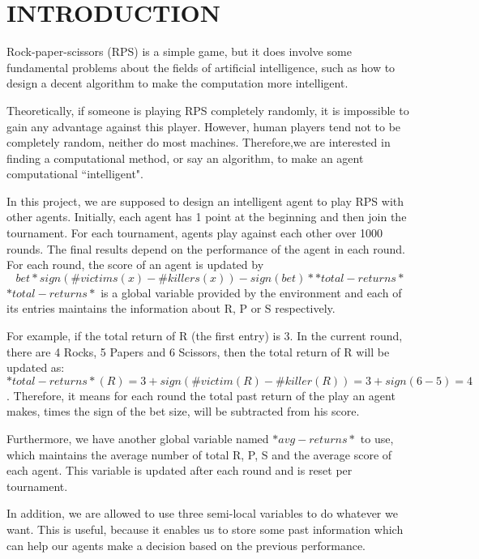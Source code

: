\documentclass[10pt]{article}
\begin{document}
\maketitle

\section{INTRODUCTION}
Rock-paper-scissors (RPS) is a simple game, but it does involve some fundamental problems about the fields of artificial intelligence, such as how to design a decent algorithm to make the computation more intelligent.

Theoretically, if someone is playing RPS completely randomly, it is impossible to gain any advantage against this player. However, human players tend not to be completely random, neither do most machines. Therefore,we are interested in finding a computational method, or say an algorithm, to make an agent computational ``intelligent".

In this project, we are supposed to design an intelligent agent to play RPS with other agents. Initially, each agent has 1 point at the beginning and then join the tournament. For each tournament, agents play against each other over 1000 rounds. The final results depend on the performance of the agent in each round. For each round, the score of an agent is updated by 
$$bet * sign(\#victims(x)-\#killers(x)) - sign(bet)* *total-returns*$$
$*total-returns*$ is a global variable provided by the environment and each of its entries maintains the information about R, P or S respectively. 

For example, if the total return of R (the first entry) is 3. In the current round, there are 4 Rocks, 5 Papers and 6 Scissors, then the total return of R will be updated as: $*total-returns*(R) = 3 + sign(\# victim(R) - \# killer(R)) = 3 + sign(6 - 5) = 4$. Therefore, it means for each round the total past return of the play an agent makes, times the sign of the bet size, will be subtracted from his score.

Furthermore, we have another global variable named $*avg-returns*$ to use, which maintains the average number of total R, P, S and the average score of each agent. This variable is updated after each round and is reset per tournament.

In addition, we are allowed to use three semi-local variables to do whatever we want. This is useful, because it enables us to store some past information which can help our agents make a decision based on the previous performance.
\end{document}
